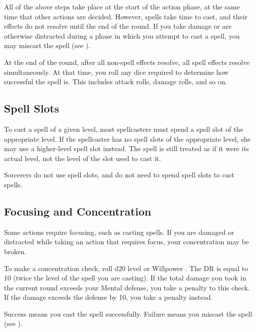         All of the above steps take place at the start of the action phase, at the same time that other actions are decided.
        However, spells take time to cast, and their effects do not resolve until the end of the round.
        If you take damage or are otherwise distracted during a phase in which you attempt to cast a spell, you may miscast the spell (see ).

        At the end of the round, after all non-spell effects resolve, all spell effects resolve simultaneously. At that time, you roll any dice required to determine how successful the spell is. This includes attack rolls, damage rolls, and so on.

    \subsection{Spell Slots}
        To cast a spell of a given level, most spellcasters must spend a spell slot of the appropriate level. If the spellcaster has no spell slots of the appropriate level, she may use a higher-level spell slot instead. The spell is still treated as if it were its actual level, not the level of the slot used to cast it.

        Sorcerers do not use spell slots, and do not need to spend spell slots to cast spells.

    \subsection{Focusing and Concentration}\label{Concentration}\label{Focus}\label{Focusing and Concentration}

        Some actions require focusing, such as casting spells.
        If you are damaged or distracted while taking an action that requires focus, your concentration may be broken.

        \label{Concentration Checks}

        To make a concentration check, roll d20 \add level or Willpower \sub {}.
        The DR is equal to 10 \add (twice the level of the spell you are casting).
        If the total damage you took in the current round exceeds your Mental defense, you take a  penalty to this check.
        If the damage exceeds the defense by 10, you take a  penalty instead.

        Success means you cast the spell successfully.
        Failure means you miscast the spell (see ).

